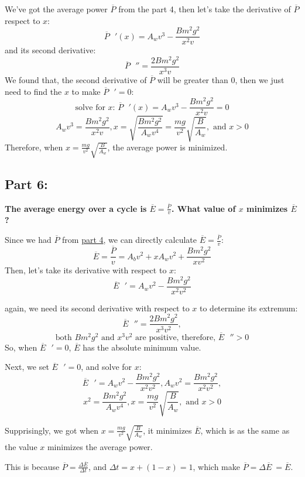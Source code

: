 \documentclass{article}
\begin{document}
We've got the average power \(\overline{P}\) from the part 4, then let's take the derivative of \(\overline{P}\) respect to \(x\):
\[\overline{P}\text{ }'(x)= A_wv^3-\frac{Bm^2g^2}{x^2v}\]
and its second derivative:
\[\overline{P}\text{ }'' = \frac{2Bm^2g^2}{x^3v}\]
We found that, the second derivative of \(\overline{P}\) will be greater than \(0\), then we just need to find the \(x\) to make  \(\overline{P}\text{ }' = 0\):
\[\text{solve for }x \text{: }\overline{P}\text{ }'(x)= A_wv^3-\frac{Bm^2g^2}{x^2v} =0 \]
\[A_wv^3 = \frac{Bm^2g^2}{x^2v}, x = \sqrt{\frac{Bm^2g^2}{A_wv^4}} = \frac{mg}{v^2}\sqrt{\frac{B}{A_w}},\text{ and }x > 0\]
Therefore, when \(x = \frac{mg}{v^2}\sqrt{\frac{B}{A_w}}\), the average power is minimized.

\subsection*{Part 6:}
{\large \bfseries The average energy over a cycle is \(\overline{E} = \frac{\overline{P}}{v}\). What value of \(x\) minimizes \(\overline{E}\) ?}

Since we had \(\overline{P}\) from \hyperref[sec:part4]{part 4}, we can directly calculate \(\overline{E} = \frac{\overline{P}}{v}\):
\[\overline{E} = \frac{\overline{P}}{v}=  A_bv^2+xA_wv^2 + \frac{Bm^2g^2}{xv^2} \]
Then, let's take its derivative with respect to \(x\):
\[\overline{E}\text{ }' = A_wv^2-\frac{Bm^2g^2}{x^2v^2}\]

again, we need its second derivative with respect to \(x\) to determine its extremum:
\[\overline{E}\text{ }'' = \frac{2Bm^2g^2}{x^3v^2},\]
\[\text{both }Bm^2g^2 \text{ and } x^3v^2 \text{ are positive, therefore, } \overline{E} \text{ }'' > 0\]
So, when \(\overline{E}\text{ }' = 0\), \(\overline{E}\) has the absolute minimum value.

Next, we set \(\overline{E}\text{ }' = 0\), and solve for \(x\):
\[\overline{E}\text{ }' = A_wv^2-\frac{Bm^2g^2}{x^2v^2}, A_wv^2 = \frac{Bm^2g^2}{x^2v^2},\]
\[x^2=\frac{Bm^2g^2}{A_wv^4}, x = \frac{mg}{v^2}\sqrt{\frac{B}{A_w}},\text{ and }x > 0\]

Supprisingly, we got when \(x = \frac{mg}{v^2}\sqrt{\frac{B}{A_w}}\), it minimizes \(\overline{E}\), which is as the same as the value \(x\) minimizes the average power.

This is because \(\overline{P}= \frac{{\Delta \overline{E}}}{\Delta t}\), and \(\Delta t = x + (1-x) =1\), which make \(\overline{P} = \Delta \overline{E}\ = \overline{E}\).
\end{document}
